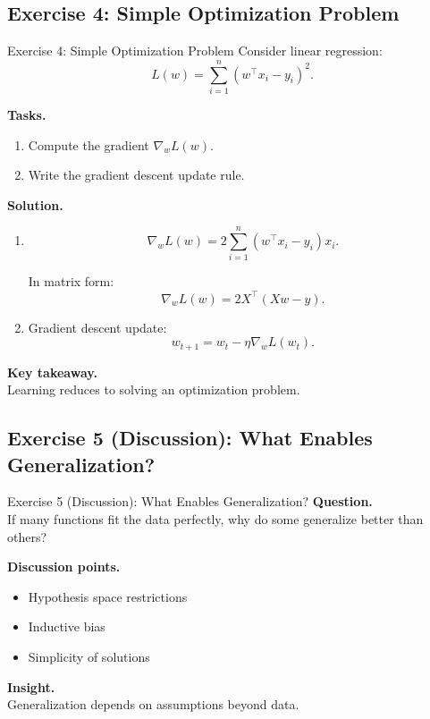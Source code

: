 \documentclass[aspectratio=169,11pt]{beamer}
\begin{document}
\subsection{Exercise 4: Simple Optimization Problem}
\begin{frame}[t,allowframebreaks]{Exercise 4: Simple Optimization Problem}
\small
Consider linear regression:
\[
L(w) = \sum_{i=1}^n (w^\top x_i - y_i)^2.
\]

\textbf{Tasks.}\\ \begin{enumerate}
    \item Compute the gradient $\nabla_w L(w)$.
    \item Write the gradient descent update rule.
\end{enumerate}

\textbf{Solution.}\\ \begin{enumerate}
    \item 
    \[
    \nabla_w L(w) = 2 \sum_{i=1}^n (w^\top x_i - y_i) x_i.
    \]

    In matrix form:
    \[
    \nabla_w L(w) = 2 X^\top (Xw - y).
    \]

    \item Gradient descent update:
    \[
    w_{t+1} = w_t - \eta \nabla_w L(w_t).
    \]
\end{enumerate}

\textbf{Key takeaway.}\\ Learning reduces to solving an optimization problem.
\end{frame}

\subsection{Exercise 5 (Discussion): What Enables Generalization?}
\begin{frame}[t,allowframebreaks]{Exercise 5 (Discussion): What Enables Generalization?}
\small
\textbf{Question.}\\ If many functions fit the data perfectly, why do some generalize better than others?

\textbf{Discussion points.}\\ \begin{itemize}
    \item Hypothesis space restrictions
    \item Inductive bias
    \item Simplicity of solutions
\end{itemize}

\textbf{Insight.}\\ Generalization depends on assumptions beyond data.
\end{frame}
\end{document}
